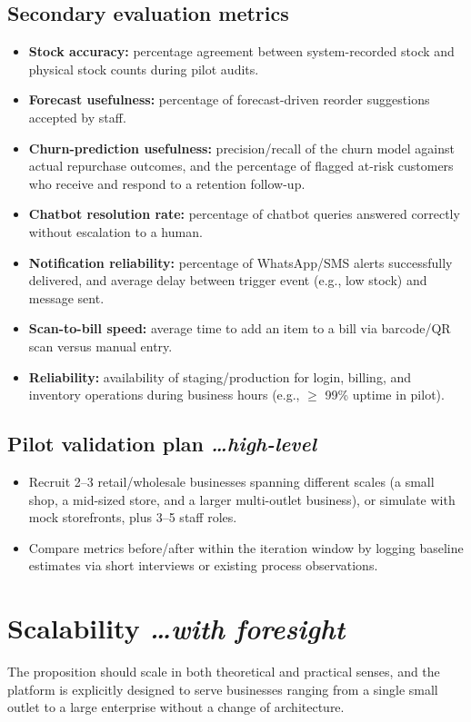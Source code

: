 \documentclass[11pt,a4paper]{article}
\newcommand{\BvrHint}[1]{%
  {\normalfont\normalsize\itshape\hfill #1}}
\begin{document}
\subsection{Secondary evaluation metrics}
\begin{itemize}[leftmargin=0.7cm]
    \item \textbf{Stock accuracy:} percentage agreement between system-recorded stock and physical stock counts during pilot audits.
    \item \textbf{Forecast usefulness:} percentage of forecast-driven reorder suggestions accepted by staff.
    \item \textbf{Churn-prediction usefulness:} precision/recall of the churn model against actual repurchase outcomes, and the percentage of flagged at-risk customers who receive and respond to a retention follow-up.
    \item \textbf{Chatbot resolution rate:} percentage of chatbot queries answered correctly without escalation to a human.
    \item \textbf{Notification reliability:} percentage of WhatsApp/SMS alerts successfully delivered, and average delay between trigger event (e.g., low stock) and message sent.
    \item \textbf{Scan-to-bill speed:} average time to add an item to a bill via barcode/QR scan versus manual entry.
    \item \textbf{Reliability:} availability of staging/production for login, billing, and inventory operations during business hours (e.g., $\ge$ 99\% uptime in pilot).
\end{itemize}

\subsection{Pilot validation plan %
\BvrHint{\ldots high-level}}
\begin{itemize}[leftmargin=0.7cm]
    \item Recruit 2--3 retail/wholesale businesses spanning different scales (a small shop, a mid-sized store, and a larger multi-outlet business), or simulate with mock storefronts, plus 3--5 staff roles.
    \item Compare metrics before/after within the iteration window by logging baseline estimates via short interviews or existing process observations.
\end{itemize}

\section{Scalability %
\BvrHint{\ldots with foresight}}
The proposition should scale in both theoretical and practical senses, and the platform is explicitly designed to serve businesses ranging from a single small outlet to a large enterprise without a change of architecture.
\end{document}
